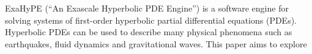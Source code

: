 ExaHyPE (``An Exascale Hyperbolic PDE Engine'') is a software engine for solving systems of first-order hyperbolic partial differential equations (PDEs).
Hyperbolic PDEs can be used to describe many physical phenomena such as earthquakes, fluid dynamics and gravitational waves.
This paper aims to explore 